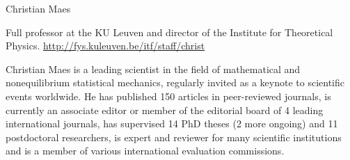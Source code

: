 \begin{participant}[type=PI,PM=12,gender=male,salary=5500]{Christian Maes}

Full professor at the KU Leuven and director of the Institute for Theoretical Physics. \url{http://fys.kuleuven.be/itf/staff/christ}

Christian Maes is a leading scientist in the field of mathematical and nonequilibrium statistical mechanics, regularly
invited as a keynote to scientific events worldwide.
%
He has published 150 articles in peer-reviewed journals,
is currently an associate editor or member of the editorial board of 4 leading international journals,
has supervised 14 PhD theses (2 more ongoing) and 11 postdoctoral researchers,
is expert and reviewer for many scientific institutions and
is a member of various international evaluation commissions.

\end{participant}

